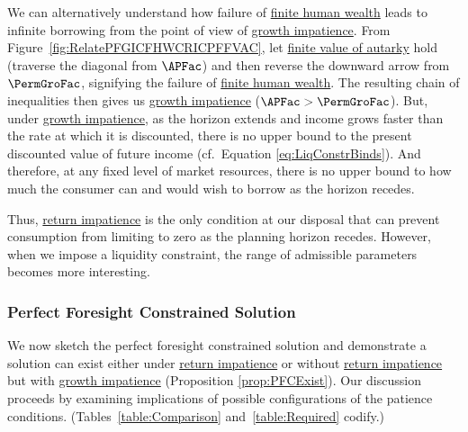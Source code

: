 \documentclass[BufferStockTheory]{subfiles}
\begin{document}
We can alternatively understand how failure of \hyperlink{FHWC}{finite human wealth} leads to infinite borrowing from the point of view of \hyperlink{GICRaw}{growth impatience}. From Figure~\ref{fig:RelatePFGICFHWCRICPFFVAC}, let \hyperlink{PFFVAC}{finite value of autarky} hold (traverse the diagonal from $\APFac$)  and then reverse the downward arrow from $\PermGroFac$,  signifying the failure of \hyperlink{FHWC}{finite human wealth}. The resulting chain of inequalities then gives us \hyperlink{GICRaw}{growth impatience} ($\APFac> \PermGroFac$). But, under \hyperlink{GICRaw}{growth impatience}, as the horizon extends and income grows faster than the rate at which it is discounted, there is no upper bound to the present discounted value of future income (cf.\ Equation \eqref{eq:LiqConstrBinds}). And therefore, at any fixed level of market resources, there is no upper bound to how much the consumer can and would wish to borrow as the horizon recedes. 

\begin{comment}
An argument similar to the discussion pertaining to Equation \eqref{eq:LiqConstrBinds}, \textit{any} arbitrarily low (negative) constraint on $\bNrm_{t}$ becomes relevant. Relaxing any constraint becomes always preferred and since income is guaranteed to grow faster than the rate of return, the consumer can continue to borrow without violating the no-ponzi condition (Equation \eqref{eq:NoDebtAtDeath}).
\end{comment}

Thus,  \hyperlink{RIC}{return impatience} is the only condition at our disposal that can prevent consumption from limiting to zero as the planning horizon recedes. However, when we impose a liquidity constraint, the range of admissible parameters becomes more interesting.

\hypertarget{PF-Constrained-Solution}{}
\hypertarget{Constrained-Solution}{}
\subsubsection{Perfect Foresight Constrained Solution}\label{subsec:PFCon}

We now sketch the perfect foresight constrained solution and demonstrate a solution can exist either under \hyperlink{RIC}{return impatience} or without \hyperlink{RIC}{return impatience} but with \hyperlink{GICRaw}{growth impatience} (Proposition \ref{prop:PFCExist}). Our discussion proceeds by examining implications of possible configurations of the patience conditions.  (Tables~\ref{table:Comparison} and~\ref{table:Required} codify.)
\end{document}
